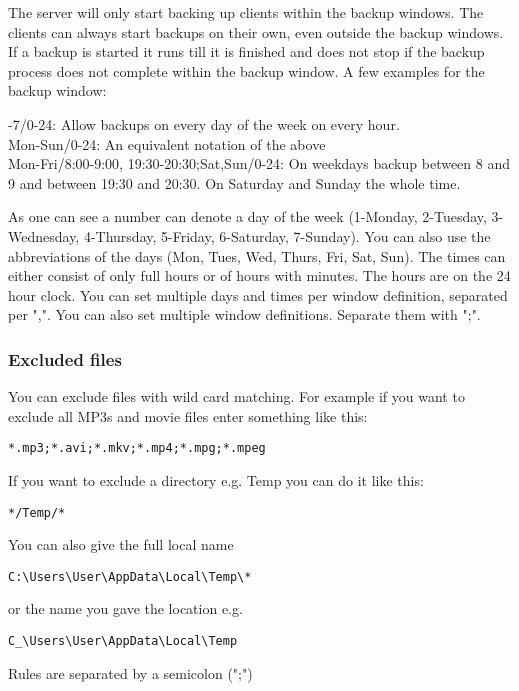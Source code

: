 \documentclass[a4paper,10pt]{article}
\begin{document}
The server will only start backing up clients within the backup windows. The clients can always start backups on their own, even outside the backup windows. If a backup is started it runs till it is finished and does not stop if the backup process does not complete within the backup window. A few examples for the backup window:
\par\null\par
{}-7/0-24: Allow backups on every day of the week on every hour.\\
Mon-Sun/0-24: An equivalent notation of the above\\
Mon-Fri/8:00-9:00, 19:30-20:30;Sat,Sun/0-24: On weekdays backup between 8 and 9 and between 19:30 and 20:30. On Saturday and Sunday the whole time.
\par\null\par
As one can see a number can denote a day of the week (1-Monday, 2-Tuesday, 3-Wednesday, 4-Thursday, 5-Friday, 6-Saturday, 7-Sunday). You can also use the abbreviations of the days (Mon, Tues, Wed, Thurs, Fri, Sat, Sun). The times can either consist of only full hours or of hours with minutes. The hours are on the 24 hour clock. You can set multiple days and times per window definition, separated per ",". You can also set multiple window definitions. Separate them with ";".

\subsubsection{Excluded files}
\label{subsub_excluded_files}

You can exclude files with wild card matching. For example if you want to exclude all MP3s and movie files enter something like this:
\begin{verbatim}
*.mp3;*.avi;*.mkv;*.mp4;*.mpg;*.mpeg
\end{verbatim}
If you want to exclude a directory e.g. Temp you can do it like this:
\begin{verbatim}
*/Temp/*
\end{verbatim}
You can also give the full local name
\begin{verbatim}
C:\Users\User\AppData\Local\Temp\*
\end{verbatim}
or the name you gave the location e.g.
\begin{verbatim}
C_\Users\User\AppData\Local\Temp
\end{verbatim}

Rules are separated by a semicolon (";")
\end{document}
